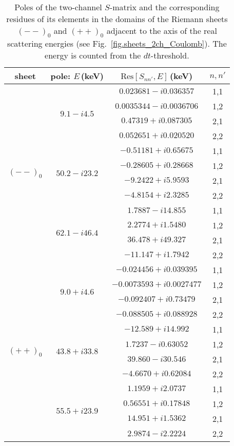 \documentclass[12pt]{article}
\begin{document}
\begin{table}
\begin{center}
\begin{tabular}{|c|c|c|c|}
\hline
\sffamily sheet & \sffamily pole: $E$\,(keV) &
\sffamily $\mathrm{Res}[S_{nn'},E]$\,(keV) & $n,n'$ \\
\hline
\hline
\multirow{12}{*}{$(--)_0$} &
\multirow{4}{*}{$9.1-i4.5$} & $0.023681-i0.036357$   & 1,1 \\
&&           $0.0035344-i0.0036706$ & 1,2 \\
&&           $0.47319+i0.087305$    & 2,1 \\
&&           $0.052651+i0.020520$   & 2,2 \\
\cline{2-4}		
&
\multirow{4}{*}{$50.2-i23.2$} & $-0.51181+i0.65675$ &  1,1 \\
&           & $-0.28605+i 0.28668$ &  1,2 \\
&           & $-9.2422+i 5.9593$ &  2,1 \\
&           & $-4.8154+i2.3285$   &  2,2 \\
\cline{2-4}	
&
\multirow{4}{*}{$62.1-i46.4$} & $1.7887-i14.855$    &  1,1 \\
&           &  $2.2774+i 1.5480$  &  1,2 \\
&           & $36.478+i 49.327$   &  2,1 \\
&           & $-11.147+i1.7942$   &  2,2 \\
\hline
\hline
\multirow{12}{*}{$(++)_0$} &
\multirow{4}{*}{$9.0+i4.6$} & $-0.024456+i 0.039395$ & 1,1 \\
&          & $-0.0073593+i 0.0027477$ & 1,2 \\
&          & $-0.092407+i 0.73479$ & 2,1 \\
&          & $-0.088505+i 0.088928$ & 2,2 \\
\cline{2-4}		
&
\multirow{4}{*}{$43.8+i33.8$} & $-12.589+i 14.992$ &  1,1 \\
&           & $1.7237-i 0.63052$ &  1,2 \\
&           & $39.860-i 30.546$ &  2,1 \\
&           & $-4.6670+i 0.62084$ &  2,2 \\
\cline{2-4}	
&
\multirow{4}{*}{$55.5+i23.9$} & $1.1959+i 2.0737$ &  1,1 \\
&           & $0.56551+i 0.17848$ &  1,2 \\
&           & $14.951+i 1.5362$ &  2,1 \\
&           & $2.9874-i 2.2224$ &  2,2 \\
\hline
\end{tabular}
\end{center}
\caption{\sf
Poles of the two-channel $S$-matrix and the corresponding residues of its
elements in the domains of the Riemann sheets $(--)_0$ and $(++)_0$
adjacent to the axis of the real scattering energies (see
Fig.~\ref{fig.sheets_2ch_Coulomb}).
The energy is counted from the $dt$-threshold.
}
\label{table.Residues}
\end{table}
\end{document}
